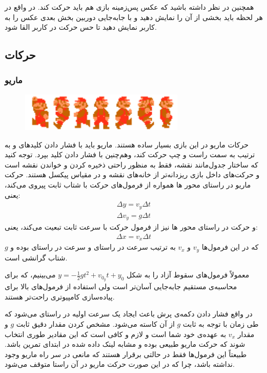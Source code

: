 \documentclass{utap}
\begin{document}
همچنین در نظر داشته باشید که عکس پس‌زمینه بازی هم باید حرکت کند. در واقع در هر لحظه باید بخشی از آن را نمایش دهید و با جابه‌جایی دوربین بخش بعدی عکس را به کاربر نمایش دهید تا حس حرکت در کاربر القا شود.
	\subsection{حرکات}
		\subsubsection{ماریو}
			\begin{figure}[H]
			\begin{center}
				\includegraphics[width=0.7\textwidth]{marioWalk}
			\end{center}
		\end{figure}
حرکات ماریو در این بازی بسیار ساده هستند. ماریو باید با فشار دادن کلید‌های  و  به ترتیب به سمت راست و چپ حرکت کند، وهم‌چنین با فشار دادن کلید  بپرد. توجه کنید که ساختار جدول‌مانند نقشه، فقط به منظور راحتی ذخیره کردن و خواندن نقشه است و حرکت‌های داخل بازی ریزدانه‌تر از خانه‌های نقشه و در مقیاس پیکسل هستند. حرکت ماریو در راستای محور ‌ها همواره از فرمول‌های حرکت با شتاب ثابت پیروی می‌کند، یعنی:
	\begin{gather*}
		\Delta y = v_y \Delta t\\
		\Delta v_y = g \Delta t
	\end{gather*}
و حرکت در راستای محور ‌ها نیز از فرمول حرکت با سرعت ثابت تبعیت می‌کند، یعنی:
	\begin{gather*}
		\Delta x = v_x \Delta t
	\end{gather*}
که در این فرمول‌ها $v_y$ و $v_x$ به ترتیب سرعت در راستای  و سرعت در راستای  بوده و $g$ شتاب گرانشی است.

معمولاً فرمول‌های سقوط آزاد را به شکل
$y = -\frac{1}{2}gt^2 + v_{0_y} t + y_0$
می‌بینیم، که برای محاسبه‌ی مستقیم جابه‌جایی آسان‌تر است ولی استفاده از فرمول‌های بالا برای پیاده‌سازی کامپیوتری راحت‌تر هستند.

در واقع فشار دادن دکمه‌ی پرش باعث ایجاد یک سرعت اولیه در راستای‌  می‌شود که طی زمان با توجه به ثابت $g$ از آن کاسته می‌شود. مشخص کردن مقدار دقیق ثابت $g$ و مقدار $v_x$ به عهده‌ی خود شما است و لازم و کافی است که این مقادیر طوری انتخاب شوند که حرکت ماریو طبیعی بوده و مشابه لینک داده شده در ابتدای تمرین باشد. طبیعتاً این فرمول‌ها فقط در حالتی برقرار هستند که مانعی در سر راه ماریو وجود نداشته باشد، چرا که در این صورت حرکت ماریو در آن راستا متوقف می‌شود.
\end{document}
